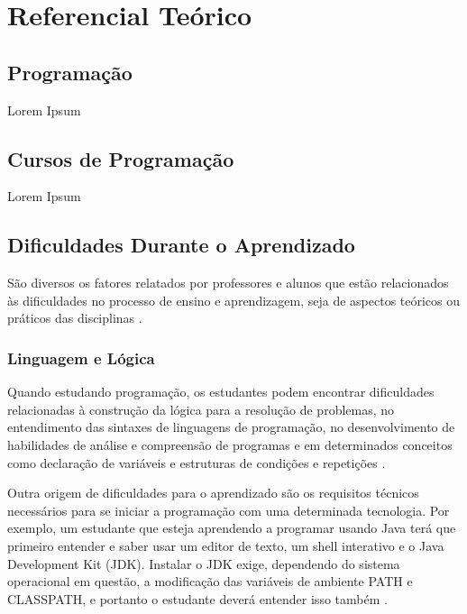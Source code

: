 \chapter[Referencial Teórico]{Referencial Teórico}

\section{Programação}

Lorem Ipsum

\section{Cursos de Programação}

Lorem Ipsum

\section{Dificuldades Durante o Aprendizado}

São diversos os fatores relatados por professores e alunos que estão relacionados às dificuldades no processo de ensino e aprendizagem, seja de aspectos teóricos ou práticos das disciplinas \cite{marcolino2015}.%

\subsection{Linguagem e Lógica}

Quando estudando programação, os estudantes podem encontrar dificuldades relacionadas à construção da lógica para a resolução de problemas, no entendimento das sintaxes de linguagens de programação, no desenvolvimento de habilidades de análise e compreensão de programas \cite{robins2010} e em determinados conceitos como declaração de variáveis e estruturas de condições e repetições \cite{helminen2010}.

Outra origem de dificuldades para o aprendizado são os requisitos técnicos necessários para se iniciar a programação com uma determinada tecnologia. Por exemplo, um estudante que esteja aprendendo a programar usando Java terá que primeiro entender e saber usar um editor de texto, um shell interativo e o Java Development Kit (JDK). Instalar o JDK exige, dependendo do sistema operacional em questão, a modificação das variáveis de ambiente PATH e CLASSPATH, e portanto o estudante deverá entender isso também \cite{truong2003}.

